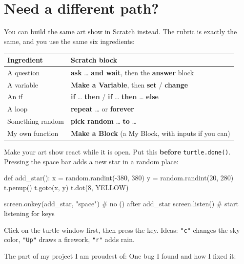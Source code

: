 \documentclass[level=1]{kidscode}
\begin{document}
\section{Need a different path?}
\begin{tip}
You can build the same art show in Scratch instead. The rubric is exactly the same,
and you use the same six ingredients:
\begin{center}
\small\renewcommand{\arraystretch}{1.3}
\begin{tabular}{@{}ll@{}}
\toprule
Ingredient & Scratch block\\
\midrule
A question & \textbf{ask} \dots{} \textbf{and wait}, then the \textbf{answer} block\\
A variable & \textbf{Make a Variable}, then \textbf{set} / \textbf{change}\\
An if & \textbf{if} \dots{} \textbf{then} / \textbf{if} \dots{} \textbf{then} \dots{} \textbf{else}\\
A loop & \textbf{repeat} \dots{} or \textbf{forever}\\
Something random & \textbf{pick random} \dots{} \textbf{to} \dots\\
My own function & \textbf{Make a Block} (a My Block, with inputs if you can)\\
\bottomrule
\end{tabular}
\end{center}
\end{tip}

\begin{stretchchallenge}
Make your art show react while it is open. Put this \textbf{before} \texttt{turtle.done()}.
Pressing the space bar adds a new star in a random place:
\begin{pycode}
def add_star():
    x = random.randint(-380, 380)
    y = random.randint(20, 280)
    t.penup()
    t.goto(x, y)
    t.dot(8, YELLOW)

screen.onkey(add_star, "space")   # no () after add_star
screen.listen()                   # start listening for keys
\end{pycode}
Click on the turtle window first, then press the key. Ideas: \texttt{"c"} changes the sky color,
\texttt{"Up"} draws a firework, \texttt{"r"} adds rain.
\end{stretchchallenge}

\begin{reflection}
The part of my project I am proudest of:
One bug I found and how I fixed it:
\end{reflection}
\end{document}
